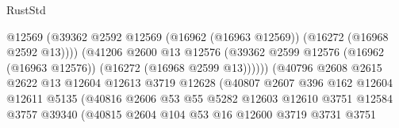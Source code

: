 \begin{lexlean}{RustStd}
\begin{coremodule}
                                            @12569
                                            (@39362
                                              @2592
                                              @12569
                                              (@16962 (@16963 @12569))
                                              (@16272 (@16968 @2592 @13))))
                                          (@41206
                                            @2600
                                            @13
                                            @12576
                                            (@39362
                                              @2599
                                              @12576
                                              (@16962 (@16963 @12576))
                                              (@16272 (@16968 @2599 @13))))))
                                      (@40796
                                        @2608
                                        @2615
                                        @2622
                                        @13
                                        @12604
                                        @12613
                                        @3719
                                        @12628
                                        (@40807
                                          @2607
                                          @396
                                          @162
                                          @12604
                                          @12611
                                          @5135
                                          (@40816
                                            @2606
                                            @53
                                            @55
                                            @5282
                                            @12603
                                            @12610
                                            @3751
                                            @12584
                                            @3757
                                            @39340
                                            (@40815
                                              @2604
                                              @104
                                              @53
                                              @16
                                              @12600
                                              @3719
                                              @3731
                                              @3751

\end{coremodule}
\end{lexlean}
